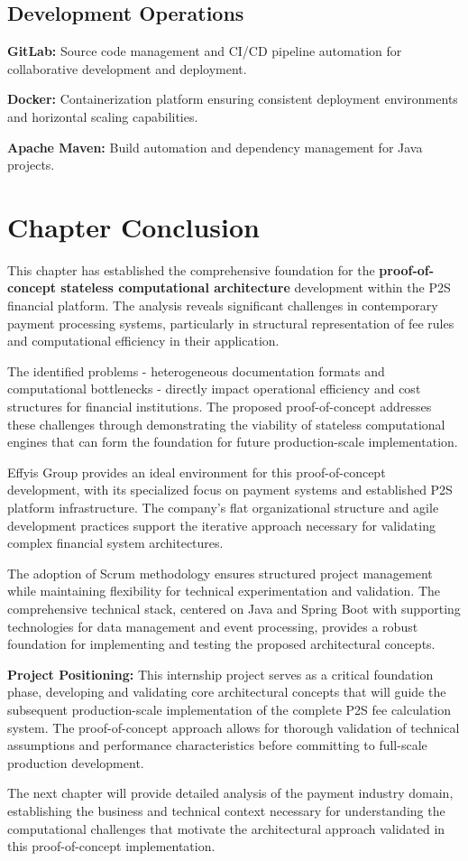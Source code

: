\subsection{Development Operations}

\textbf{GitLab:} Source code management and CI/CD pipeline automation for collaborative development and deployment.

\textbf{Docker:} Containerization platform ensuring consistent deployment environments and horizontal scaling capabilities.

\textbf{Apache Maven:} Build automation and dependency management for Java projects.

\section{Chapter Conclusion}

This chapter has established the comprehensive foundation for the \textbf{proof-of-concept stateless computational architecture} development within the P2S financial platform. The analysis reveals significant challenges in contemporary payment processing systems, particularly in structural representation of fee rules and computational efficiency in their application.

The identified problems - heterogeneous documentation formats and computational bottlenecks - directly impact operational efficiency and cost structures for financial institutions. The proposed proof-of-concept addresses these challenges through demonstrating the viability of stateless computational engines that can form the foundation for future production-scale implementation.

Effyis Group provides an ideal environment for this proof-of-concept development, with its specialized focus on payment systems and established P2S platform infrastructure. The company's flat organizational structure and agile development practices support the iterative approach necessary for validating complex financial system architectures.

The adoption of Scrum methodology ensures structured project management while maintaining flexibility for technical experimentation and validation. The comprehensive technical stack, centered on Java and Spring Boot with supporting technologies for data management and event processing, provides a robust foundation for implementing and testing the proposed architectural concepts.

\textbf{Project Positioning:} This internship project serves as a critical foundation phase, developing and validating core architectural concepts that will guide the subsequent production-scale implementation of the complete P2S fee calculation system. The proof-of-concept approach allows for thorough validation of technical assumptions and performance characteristics before committing to full-scale production development.

The next chapter will provide detailed analysis of the payment industry domain, establishing the business and technical context necessary for understanding the computational challenges that motivate the architectural approach validated in this proof-of-concept implementation.
